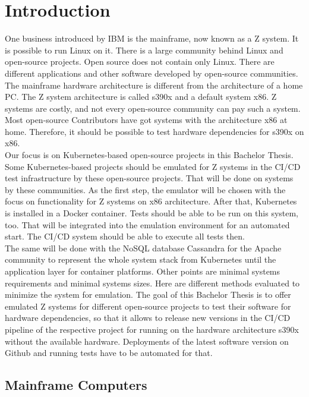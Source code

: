 \chapter{Introduction}\label{ch:intro}

One business introduced by IBM is the mainframe, now known as a Z system. It is possible to run Linux on it. There is a large community behind Linux and open-source projects. Open source does not contain only \gls{Linux}. There are different applications and other software developed by open-source communities. The mainframe hardware architecture is different from the architecture of a home PC. The Z system architecture is called \gls{s390x} and a default system \gls{x86}. \gls{Z systems} are costly, and not every open-source community can pay such a system. Most open-source Contributors have got systems with the architecture x86 at home. Therefore, it should be possible to test hardware dependencies for s390x on x86. \\
Our focus is on Kubernetes-based open-source projects in this Bachelor Thesis. Some Kubernetes-based projects should be emulated for Z systems in the \gls{CI/CD} test infrastructure by these open-source projects. That will be done on systems by these communities. As the first step, the emulator will be chosen with the focus on functionality for Z systems on x86 architecture. After that, Kubernetes is installed in a Docker container. Tests should be able to be run on this system, too. That will be integrated into the emulation environment for an automated start. The CI/CD system should be able to execute all tests then. \\
The same will be done with the NoSQL database Cassandra for the Apache community to represent the whole system stack from Kubernetes until the \gls{application layer} for container platforms. Other points are minimal systems requirements and minimal systems sizes. Here are different methods evaluated to minimize the system for emulation.
The goal of this Bachelor Thesis is to offer emulated Z systems for different open-source projects to test their software for hardware dependencies, so that it allows to release new versions in the CI/CD pipeline of the respective project for running on the hardware architecture s390x without the available hardware. Deployments of the latest software version on Github and running tests have to be automated for that.



\section{Mainframe Computers}

